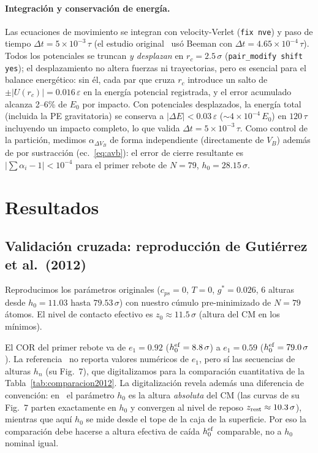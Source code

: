 \documentclass[aps,pre,twocolumn,reprint,superscriptaddress]{revtex4-2}
\newcommand{\eps}{\varepsilon}
\newcommand{\gstar}{g^*}
\begin{document}
\paragraph{Integración y conservación de energía.}
Las ecuaciones de movimiento se integran con velocity-Verlet
(\texttt{fix nve}) y paso de tiempo $\Delta t = 5\times10^{-3}\,\tau$
(el estudio original~\cite{Gutierrez2012} usó Beeman con
$\Delta t = 4.65\times10^{-4}\,\tau$). Todos los potenciales se truncan
\emph{y desplazan} en $r_c=2.5\,\sigma$ (\texttt{pair\_modify shift yes});
el desplazamiento no altera fuerzas ni trayectorias, pero es esencial para
el balance energético: sin él, cada par que cruza $r_c$ introduce un salto
de $\pm|U(r_c)|=0.016\,\eps$ en la energía potencial registrada, y el error
acumulado alcanza 2--6\% de $E_0$ por impacto. Con potenciales desplazados,
la energía total (incluida la PE gravitatoria) se conserva a
$|\Delta E|<0.03\,\eps$ ($\sim4\times10^{-4}\,E_0$) en $120\,\tau$
incluyendo un impacto completo, lo que valida $\Delta t=5\times10^{-3}\,\tau$.
Como control de la partición, medimos $\alpha_{\Delta V_B}$ de forma
independiente (directamente de $V_B$) además de por sustracción
(ec.~\eqref{eq:avb}): el error de cierre resultante es
$|\sum\alpha_i-1|<10^{-4}$ para el primer rebote de $N=79$,
$h_0=28.15\,\sigma$.

\section{Resultados}
\label{sec:resultados}

\subsection{Validación cruzada: reproducción de Gutiérrez et al.\ (2012)}
\label{sec:reproduccion}

Reproducimos los parámetros originales ($c_{ps}=0$, $T=0$, $\gstar=0.026$,
6 alturas desde $h_0=11.03$ hasta $79.53\,\sigma$) con nuestro cúmulo
pre-minimizado de $N=79$ átomos. El nivel de contacto efectivo es
$z_0\approx11.5\,\sigma$ (altura del CM en los mínimos).

El COR del primer rebote va de $e_1=0.92$ ($h_0^{\rm ef}=8.8\,\sigma$) a
$e_1=0.59$ ($h_0^{\rm ef}=79.0\,\sigma$). La referencia~\cite{Gutierrez2012}
no reporta valores numéricos de $e_1$, pero sí las secuencias de alturas
$h_n$ (su Fig.~7), que digitalizamos para la comparación cuantitativa de la
Tabla~\ref{tab:comparacion2012}. La digitalización revela además una
diferencia de convención: en~\cite{Gutierrez2012} el parámetro $h_0$ es la
altura \emph{absoluta} del CM (las curvas de su Fig.~7 parten exactamente
en $h_0$ y convergen al nivel de reposo $z_{\rm rest}\approx10.3\,\sigma$),
mientras que aquí $h_0$ se mide desde el tope de la caja de la superficie.
Por eso la comparación debe hacerse a altura efectiva de caída
$h_0^{\rm ef}$ comparable, no a $h_0$ nominal igual.
\end{document}
